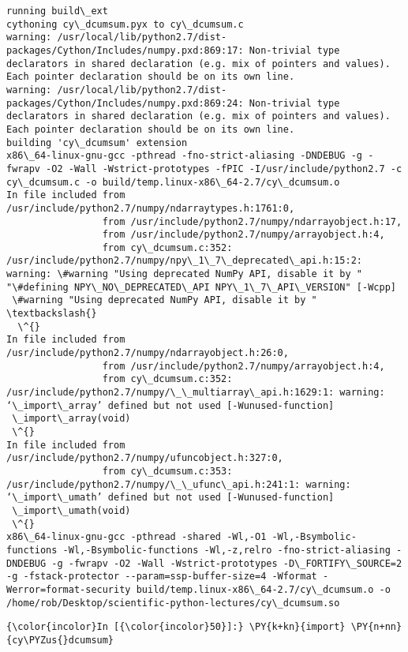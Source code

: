     \begin{Verbatim}[commandchars=\\\{\}]
running build\_ext
cythoning cy\_dcumsum.pyx to cy\_dcumsum.c
warning: /usr/local/lib/python2.7/dist-packages/Cython/Includes/numpy.pxd:869:17: Non-trivial type declarators in shared declaration (e.g. mix of pointers and values). Each pointer declaration should be on its own line.
warning: /usr/local/lib/python2.7/dist-packages/Cython/Includes/numpy.pxd:869:24: Non-trivial type declarators in shared declaration (e.g. mix of pointers and values). Each pointer declaration should be on its own line.
building 'cy\_dcumsum' extension
x86\_64-linux-gnu-gcc -pthread -fno-strict-aliasing -DNDEBUG -g -fwrapv -O2 -Wall -Wstrict-prototypes -fPIC -I/usr/include/python2.7 -c cy\_dcumsum.c -o build/temp.linux-x86\_64-2.7/cy\_dcumsum.o
In file included from /usr/include/python2.7/numpy/ndarraytypes.h:1761:0,
                 from /usr/include/python2.7/numpy/ndarrayobject.h:17,
                 from /usr/include/python2.7/numpy/arrayobject.h:4,
                 from cy\_dcumsum.c:352:
/usr/include/python2.7/numpy/npy\_1\_7\_deprecated\_api.h:15:2: warning: \#warning "Using deprecated NumPy API, disable it by " "\#defining NPY\_NO\_DEPRECATED\_API NPY\_1\_7\_API\_VERSION" [-Wcpp]
 \#warning "Using deprecated NumPy API, disable it by " \textbackslash{}
  \^{}
In file included from /usr/include/python2.7/numpy/ndarrayobject.h:26:0,
                 from /usr/include/python2.7/numpy/arrayobject.h:4,
                 from cy\_dcumsum.c:352:
/usr/include/python2.7/numpy/\_\_multiarray\_api.h:1629:1: warning: ‘\_import\_array’ defined but not used [-Wunused-function]
 \_import\_array(void)
 \^{}
In file included from /usr/include/python2.7/numpy/ufuncobject.h:327:0,
                 from cy\_dcumsum.c:353:
/usr/include/python2.7/numpy/\_\_ufunc\_api.h:241:1: warning: ‘\_import\_umath’ defined but not used [-Wunused-function]
 \_import\_umath(void)
 \^{}
x86\_64-linux-gnu-gcc -pthread -shared -Wl,-O1 -Wl,-Bsymbolic-functions -Wl,-Bsymbolic-functions -Wl,-z,relro -fno-strict-aliasing -DNDEBUG -g -fwrapv -O2 -Wall -Wstrict-prototypes -D\_FORTIFY\_SOURCE=2 -g -fstack-protector --param=ssp-buffer-size=4 -Wformat -Werror=format-security build/temp.linux-x86\_64-2.7/cy\_dcumsum.o -o /home/rob/Desktop/scientific-python-lectures/cy\_dcumsum.so

    \end{Verbatim}

    \begin{Verbatim}[commandchars=\\\{\}]
{\color{incolor}In [{\color{incolor}50}]:} \PY{k+kn}{import} \PY{n+nn}{cy\PYZus{}dcumsum}
\end{Verbatim}


